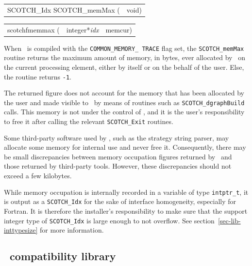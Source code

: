 \begin{itemize}
\progsyn

{\tt\begin{tabular}{l@{}l}
SCOTCH\_Idx SCOTCH\_memMax ( & void)
\end{tabular}}

{\tt\begin{tabular}{l@{}ll}
scotchfmemmax ( & integer*{\it idx} & memcur) \\

\end{tabular}}

\progdes

When \scotch\ is compiled with the {\tt COMMON\_\lbt MEMORY\_\lbt
TRACE} flag set, the {\tt SCOTCH\_memMax} routine returns the maximum
amount of memory, in bytes, ever allocated by \scotch\ on the current
processing element, either by itself or on the behalf of the
user. Else, the routine returns {\tt -1}.

The returned figure does not account for the memory that has been
allocated by the user and made visible to \scotch\ by means of
routines such as {\tt SCOTCH\_\lbt dgraph\lbt Build} calls. This
memory is not under the control of \scotch, and it is the user's
responsibility to free it after calling the relevant
{\tt SCOTCH\_\lbt *\lbt Exit} routines.

Some third-party software used by \scotch, such as the strategy string
parser, may allocate some memory for internal use and never free it.
Consequently, there may be small discrepancies between memory
occupation figures returned by \scotch\ and those returned by
third-party tools. However, these discrepancies should not exceed a
few kilobytes.

While memory occupation is internally recorded in a variable of type
{\tt intptr\_\lbt t}, it is output as a {\tt SCOTCH\_\lbt Idx} for the
sake of interface homogeneity, especially for Fortran. It is therefore
the installer's responsibility to make sure that the support integer
type of {\tt SCOTCH\_\lbt Idx} is large enough to not overflow. See
section~\ref{sec-lib-inttypesize} for more information.
\end{itemize}

\subsection{\parmetis\ compatibility library}
\label{sec-lib-parmetis}

